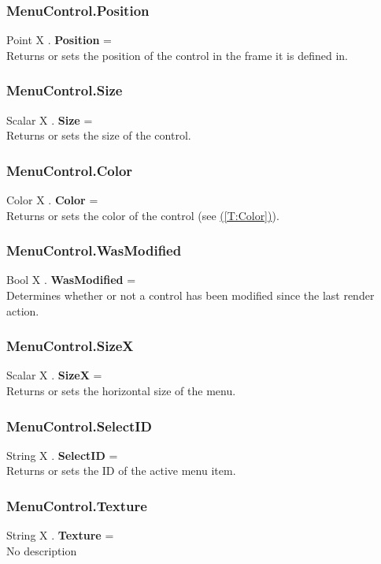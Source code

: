 \documentclass[10pt]{book}
\newcommand{\linkitem}[1]{\hyperref[#1]{\nameref{#1} (\ref{#1})}}
\begin{document}
\subsubsection{MenuControl.Position \label{F:MenuControl:Position}}
Point X . \textbf{Position} = \\
Returns or sets the position of the control in the frame it is defined in.

\subsubsection{MenuControl.Size \label{F:MenuControl:Size}}
Scalar X . \textbf{Size} = \\
Returns or sets the size of the control.

\subsubsection{MenuControl.Color \label{F:MenuControl:Color}}
Color X . \textbf{Color} = \\
Returns or sets the color of the control (see \linkitem{T:Color}).

\subsubsection{MenuControl.WasModified \label{F:MenuControl:WasModified}}
Bool X . \textbf{WasModified} = \\
Determines whether or not a control has been modified since the last render action.

\subsubsection{MenuControl.SizeX \label{F:MenuControl:SizeX}}
Scalar X . \textbf{SizeX} = \\
Returns or sets the horizontal size of the menu.

\subsubsection{MenuControl.SelectID \label{F:MenuControl:SelectID}}
String X . \textbf{SelectID} = \\
Returns or sets the ID of the active menu item.

\subsubsection{MenuControl.Texture \label{F:MenuControl:Texture}}
String X . \textbf{Texture} = \\
No description
\end{document}
